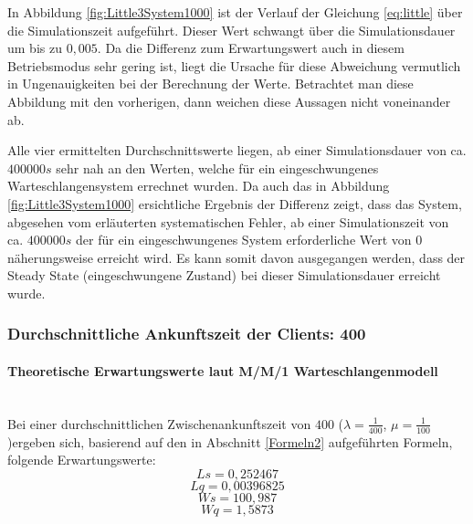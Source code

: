 In Abbildung \ref{fig:Little3System1000} ist der Verlauf der Gleichung \ref{eq:little} über die Simulationszeit aufgeführt. 
Dieser Wert schwangt über die Simulationsdauer um bis zu $0,005$. Da die Differenz zum Erwartungswert auch in diesem Betriebsmodus sehr gering ist, liegt die Ursache für diese Abweichung vermutlich in Ungenauigkeiten bei der Berechnung der Werte. Betrachtet man diese Abbildung mit den vorherigen, dann weichen diese Aussagen nicht voneinander ab.

Alle vier ermittelten Durchschnittswerte liegen, ab einer Simulationsdauer von ca. $400000s$ sehr nah an den Werten, welche für ein eingeschwungenes Warteschlangensystem errechnet wurden. Da auch das in Abbildung  \ref{fig:Little3System1000} ersichtliche Ergebnis der Differenz zeigt, dass das System, abgesehen vom erläuterten systematischen Fehler, ab einer Simulationszeit von ca. $400000s$ der für ein eingeschwungenes System erforderliche Wert von $0$ näherungsweise erreicht wird. Es kann somit davon ausgegangen werden, dass der Steady State (eingeschwungene Zustand) bei dieser Simulationsdauer erreicht wurde.

\subsubsection{Durchschnittliche Ankunftszeit der Clients: 400}
\paragraph{Theoretische Erwartungswerte laut M/M/1 Warteschlangenmodell}
\\
Bei einer durchschnittlichen Zwischenankunftszeit von $400$ ($\lambda=\frac{1}{400}$, $\mu=\frac{1}{100}$)ergeben sich, basierend auf den in Abschnitt \ref{Formeln2} aufgeführten Formeln, folgende Erwartungswerte:
\begin{equation}
Ls=0,252467
\end{equation}
\begin{equation}
Lq=0,00396825
\end{equation}
\begin{equation}
Ws=100,987
\end{equation}
\begin{equation}
Wq=1,5873
\end{equation}


